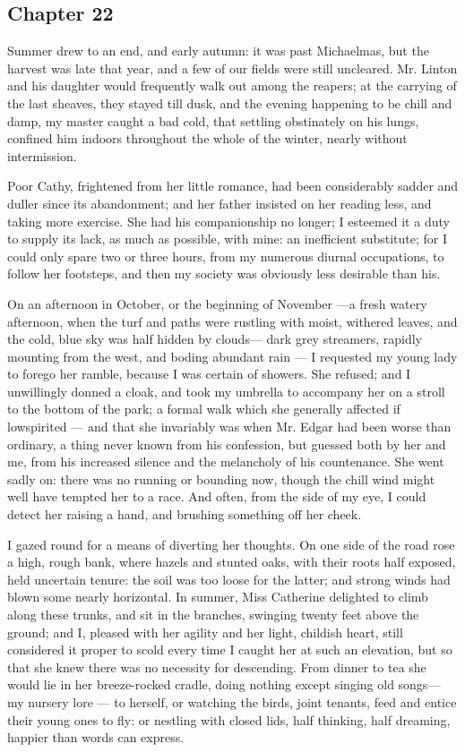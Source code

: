 \subsection*{Chapter 22}

\par Summer drew to an end, and early autumn: it was past Michaelmas, but the harvest was late that year, and a few of our fields were still uncleared. Mr. Linton and his daughter would frequently walk out among the reapers; at the carrying of the last sheaves, they stayed till dusk, and the evening happening to be chill and damp, my master caught a bad cold, that settling obstinately on his lungs, confined him indoors throughout the whole of the winter, nearly without intermission.
\par Poor Cathy, frightened from her little romance, had been considerably sadder and duller since its abandonment; and her father insisted on her reading less, and taking more exercise. She had his companionship no longer; I esteemed it a duty to supply its lack, as much as possible, with mine: an inefficient substitute; for I could only spare two or three hours, from my numerous diurnal occupations, to follow her footsteps, and then my society was obviously less desirable than his.
\par On an afternoon in October, or the beginning of November —a fresh watery afternoon, when the turf and paths were rustling with moist, withered leaves, and the cold, blue sky was half hidden by clouds— dark grey streamers, rapidly mounting from the west, and boding abundant rain — I requested my young lady to forego her ramble, because I was certain of showers. She refused; and I unwillingly donned a cloak, and took my umbrella to accompany her on a stroll to the bottom of the park; a formal walk which she generally affected if lowspirited — and that she invariably was when Mr. Edgar had been worse than ordinary, a thing never known from his confession, but guessed both by her and me, from his increased silence and the melancholy of his countenance. She went sadly on: there was no running or bounding now, though the chill wind might well have tempted her to a race. And often, from the side of my eye, I could detect her raising a hand, and brushing something off her cheek.
\par I gazed round for a means of diverting her thoughts. On one side of the road rose a high, rough bank, where hazels and stunted oaks, with their roots half exposed, held uncertain tenure: the soil was too loose for the latter; and strong winds had blown some nearly horizontal. In summer, Miss Catherine delighted to climb along these trunks, and sit in the branches, swinging twenty feet above the ground; and I, pleased with her agility and her light, childish heart, still considered it proper to scold every time I caught her at such an elevation, but so that she knew there was no necessity for descending. From dinner to tea she would lie in her breeze-rocked cradle, doing nothing except singing old songs— my nursery lore — to herself, or watching the birds, joint tenants, feed and entice their young ones to fly: or nestling with closed lids, half thinking, half dreaming, happier than words can express.
